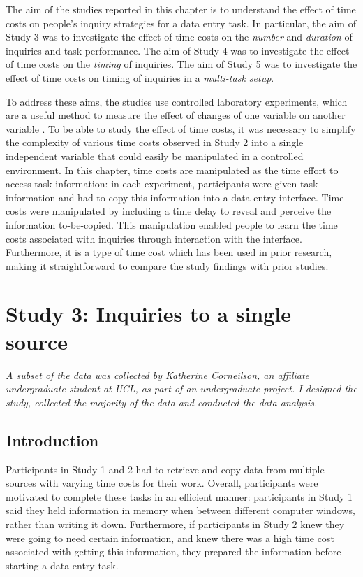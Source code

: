 The aim of the studies reported in this chapter is to understand the effect of time costs on people’s inquiry strategies for a data entry task. In particular, the aim of Study 3 was to investigate the effect of time costs on the \textit{number} and \textit{duration} of inquiries and task performance. The aim of Study 4 was to investigate the effect of time costs on the \textit{timing} of inquiries. The aim of Study 5 was to investigate the effect of time costs on timing of inquiries in a \textit{multi-task setup}.

To address these aims, the studies use controlled laboratory experiments, which are a useful method to measure the effect of changes of one variable on another variable \citep{Cairns2008}. To be able to study the effect of time costs, it was necessary to simplify the complexity of various time costs observed in Study 2 into a single independent variable that could easily be manipulated in a controlled environment. In this chapter, time costs are manipulated as the time effort to access task information: in each experiment, participants were given task information and had to copy this information into a data entry interface. Time costs were manipulated by including a time delay to reveal and perceive the information to-be-copied. This manipulation enabled people to learn the time costs associated with inquiries through interaction with the interface. Furthermore, it is a type of time cost which has been used in prior research, making it straightforward to compare the study findings with prior studies.

\section{Study 3: Inquiries to a single source}\label{ch:Study3}

\textit{A subset of the data was collected by Katherine Corneilson, an affiliate undergraduate student at UCL, as part of an undergraduate project. I designed the study, collected the majority of the data and conducted the data analysis.}

\subsection{Introduction}
Participants in Study 1 and 2 had to retrieve and copy data from multiple sources with varying time costs for their work. Overall, participants were motivated to complete these tasks in an efficient manner: participants in Study 1 said they held information in memory when between different computer windows, rather than writing it down. Furthermore, if participants in Study 2 knew they were going to need certain information, and knew there was a high time cost associated with getting this information, they prepared the information before starting a data entry task. 

